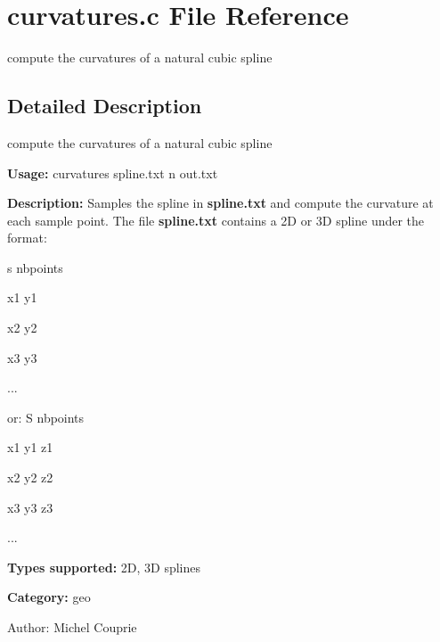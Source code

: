 \section{curvatures.c File Reference}
\label{curvatures_8c}
compute the curvatures of a natural cubic spline  




\label{_details}
\subsection{Detailed Description}
compute the curvatures of a natural cubic spline 

{\bf Usage:} curvatures spline.txt n out.txt

{\bf Description:} Samples the spline in {\bf spline.txt} and compute the curvature at each sample point. The file {\bf spline.txt} contains a 2D or 3D spline under the format:\par
 s nbpoints\par
 x1 y1\par
 x2 y2\par
 x3 y3\par
 ...\par
 or: S nbpoints\par
 x1 y1 z1\par
 x2 y2 z2\par
 x3 y3 z3\par
 ...\par


{\bf Types supported:} 2D, 3D splines

{\bf Category:} geo

\begin{Desc}
\item[Author:]Michel Couprie \end{Desc}
